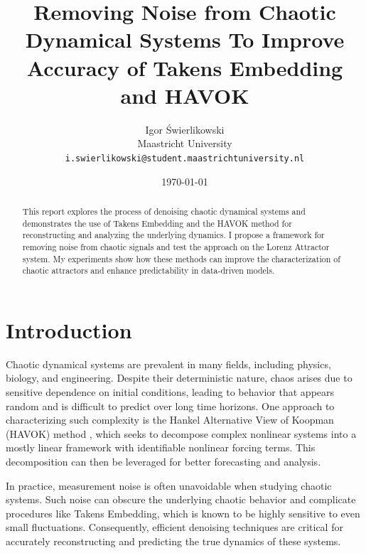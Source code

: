 \documentclass[11pt]{article}
\title{Removing Noise from Chaotic Dynamical Systems To Improve Accuracy of Takens Embedding and HAVOK}
\author{Igor Świerlikowski \\
	Maastricht University \\
	\texttt{i.swierlikowski@student.maastrichtuniversity.nl}}
\date{\today}
\begin{document}
	
	\maketitle
	
	\begin{abstract}
		This report explores the process of denoising chaotic dynamical systems and demonstrates the use of Takens Embedding and the HAVOK method for reconstructing and analyzing the underlying dynamics. I propose a framework for removing noise from chaotic signals and test the approach on the Lorenz Attractor system. My experiments show how these methods can improve the characterization of chaotic attractors and enhance predictability in data-driven models.
	\end{abstract}
	
	
	
	\section{Introduction}
	Chaotic dynamical systems are prevalent in many fields, including physics, biology, and engineering. Despite their deterministic nature, chaos arises due to sensitive dependence on initial conditions, leading to behavior that appears random and is difficult to predict over long time horizons. One approach to characterizing such complexity is the Hankel Alternative View of Koopman (HAVOK) method \citep{brunton2017}, which seeks to decompose complex nonlinear systems into a mostly linear framework with identifiable nonlinear forcing terms. This decomposition can then be leveraged for better forecasting and analysis.
	
	In practice, measurement noise is often unavoidable when studying chaotic systems. Such noise can obscure the underlying chaotic behavior and complicate procedures like Takens Embedding, which is known to be highly sensitive to even small fluctuations. Consequently, efficient denoising techniques are critical for accurately reconstructing and predicting the true dynamics of these systems.
	
\end{document}
